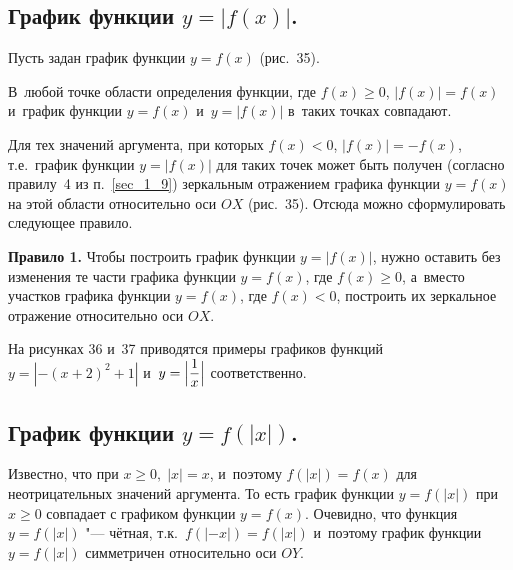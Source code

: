 \subsection{График функции $y = |f(x)|$.}

Пусть задан график функции $y = f(x)$ (рис.\ 35).

\begin{figure}
\end{figure}

В~любой точке области определения функции,
где $f(x) \geqslant 0$, $|f(x)| = f(x)$
и~график функции $y = f(x)$ и~$y = |f(x)|$
в~таких точках совпадают.

Для тех значений аргумента, при которых $f(x) < 0$,
$|f(x)| = -f(x)$, т.е.\ график функции $y = |f(x)|$
для таких точек может быть получен (согласно правилу~4
из п.~\ref{sec_1_9}) зеркальным отражением графика функции $y = f(x)$
на этой области относительно оси $OX$ (рис.\ 35).
Отсюда можно сформулировать следующее правило.

\textbf{Правило 1.} Чтобы построить график функции $y = |f(x)|$,
нужно оставить без изменения те части графика функции $y = f(x)$,
где $f(x) \geqslant 0$, а~вместо участков графика функции $y = f(x)$,
где $f(x) < 0$, построить их зеркальное отражение относительно оси $OX$.

\begin{figure}
\end{figure}

На рисунках 36 и~37 приводятся примеры графиков функций
$y = |-(x + 2)^{2} + 1|$ и~$\displaystyle y = \Bigl|\frac{1}{x}\Bigr|$
соответственно.

\begin{figure}
\end{figure}

\begin{figure}
\end{figure}


\subsection{График функции $y = f(|x|)$.}

Известно, что при $x \geqslant 0, \; |x| = x$,
и~поэтому $f(|x|) = f(x)$ для неотрицательных значений аргумента.
То есть график функции $y = f(|x|)$ при $x \geqslant 0$ совпадает с графиком
функции $y = f(x)$.
Очевидно, что функция $y = f(|x|)$ "--- чётная, т.к.\ $f(|-x|) = f(|x|)$
и~поэтому график функции $y = f(|x|)$ симметричен относительно оси $OY$.


